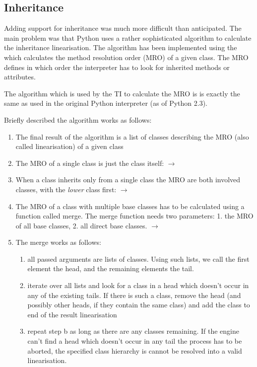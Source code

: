 \documentclass[12pt,halfparskip,DIV11,BCOR10mm]{scrreprt}
\begin{document}

\subsection{Inheritance}

Adding support for inheritance was much more difficult than anticipated. The main problem was that Python uses a rather sophisticated algorithm to calculate the inheritance linearisation. The algorithm has been implemented using the  which calculates the method resolution
order (MRO) of a given class. The MRO defines in which order the interpreter has to look for inherited methods or attributes. 

The algorithm which is used by the TI to calculate the MRO is is exactly the same as used in the original 
Python interpreter (as of Python 2.3).

Briefly described the algorithm works as follows: 
\begin{enumerate}
    \item The final result of the algorithm is a list of classes describing the MRO (also called linearisation) of a given class 
    \item The MRO of a single class is just the class itself:  $\rightarrow$ 
    \item When a class inherits only from a single class the MRO are both involved classes,  with the \emph{lower} class first:  $\rightarrow$ 
    \item The MRO of a class with multiple base classes has to be calculated using a function called merge. The merge function needs two parameters: 1. the MRO of all base classes, 2. all direct base classes.   $\rightarrow$ 
    \item The merge works as follows:
 \begin{enumerate}
    \item all passed arguments are lists of classes. Using such lists, we call the first element the head, and the remaining elements the tail. 
    \item iterate over all lists and look for a class in a head which doesn't occur in any of the existing tails. If there is such a class, remove the head (and possibly other heads, if they contain the same class) and add the class to end of the result linearisation
    \item repeat step b as long as there are any classes remaining. If the engine can't find a head which doesn't occur in any tail the process has to be aborted, the specified class hierarchy is cannot be resolved into a valid linearisation. 
 \end{enumerate}
\end{enumerate}
\end{document}
